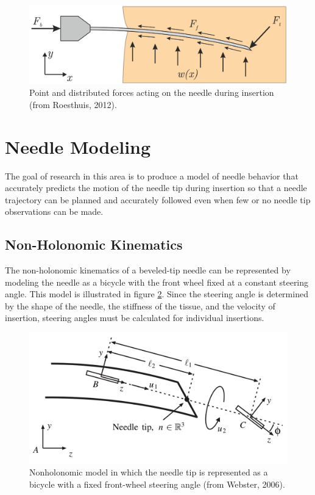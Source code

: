 \begin{figure}[h]
\includegraphics[width=1.0\textwidth]{Fig/chap2/roesthius_needle_forces.png}
\caption{Point and distributed forces acting on the needle during insertion (from Roesthuis, 2012\cite{roesthuis_mechanics-based_2012}).}
\label{fig:needle_forces}
\end{figure}

\section{Needle Modeling}
The goal of research in this area is to produce a model of needle behavior that accurately predicts the motion of the needle tip during insertion so that a needle trajectory can be planned and accurately followed even when few or no needle tip observations can be made.

\subsection{Non-Holonomic Kinematics}
The non-holonomic kinematics of a beveled-tip needle can be represented by modeling the needle as a bicycle with the front wheel fixed at a constant steering angle\cite{webster_nonholonomic_2006,cowan_robotic_2011}. This model is illustrated in figure \ref{fig:webster_nonholonomic_model}. Since the steering angle is determined by the shape of the needle, the stiffness of the tissue, and the velocity of insertion, steering angles must be calculated for individual insertions. 

\begin{figure}[h]
\includegraphics[width=1.0\textwidth]{Fig/chap2/webster_nonholonomic_model.png}
\caption{Nonholonomic model in which the needle tip is represented as a bicycle with a fixed front-wheel steering angle (from Webster, 2006\cite{webster_nonholonomic_2006}).}
\label{fig:webster_nonholonomic_model}
\end{figure}

